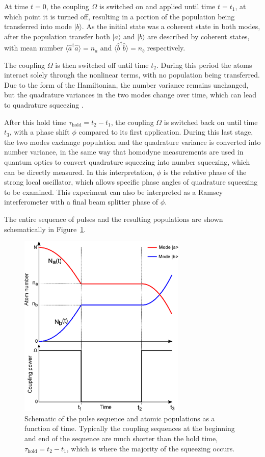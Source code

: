 \documentclass{iopart}
\begin{document}
At time $t=0$, the coupling $\Omega$ is switched on and applied until time $t=t_1$, at which point it is turned off, resulting in a portion of the population being transferred into mode $|b\rangle$. As the initial state was a coherent state in both modes, after the population transfer both $|a\rangle$ and $|b\rangle$ are described by coherent states, with mean number $\langle \hat{a}^{\dagger} \hat{a} \rangle = n_a$ and $\langle \hat{b}^{\dagger} \hat{b} \rangle = n_b$ respectively.

The coupling $\Omega$ is then switched off until time $t_2$. During this period the atoms interact solely through the nonlinear terms, with no population being transferred. Due to the form of the Hamiltonian, the number variance remains unchanged, but the quadrature variances in the two modes change over time, which can lead to quadrature squeezing \cite{johnssonET2007}.

After this hold time $\tau_{\mathrm{hold}} = t_2 - t_1 $, the coupling $\Omega$ is switched back on until time $t_3$, with a phase shift $\phi$ compared to its first application. During this last stage, the two modes exchange population and the quadrature variance is converted into number variance, in the same way that homodyne measurements are used in quantum optics to convert quadrature squeezing into number squeezing, which can be directly measured. In this interpretation, $\phi$ is the relative phase of the strong local oscillator, which allows specific phase angles of quadrature squeezing to be examined.  This experiment can also be interpreted as a Ramsey interferometer with a final beam splitter phase of $\phi$.

The entire sequence of pulses and the resulting populations are shown schematically in Figure~\ref{figPulseScheme}.

\begin{figure}
    \centering
    \includegraphics[width=8cm]{figures/pulse_scheme.eps}
    \caption{Schematic of the pulse sequence and atomic populations as a function of time.  Typically the coupling sequences at the beginning and end of the sequence are much shorter than the hold time, $\tau_{\mathrm{hold}} = t_2 - t_1 $, which is where the majority of the squeezing occurs.}
    \label{figPulseScheme}
\end{figure}
\end{document}
